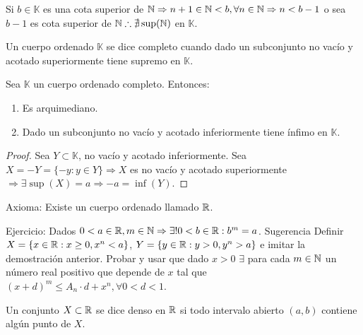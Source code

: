 Si \(b \in \mathbb{K} \) es una cota superior de \(\mathbb{N} \Rightarrow n+1 \in \mathbb{N}<b, \forall n \in \mathbb{N} \Rightarrow n < b-1\) o sea \(b-1\) es cota superior de \(\mathbb{N} \therefore \nexists \sup(\mathbb{N})\) en \(\mathbb{K} \).

\begin{definition}
    Un cuerpo ordenado \(\mathbb{K} \) se dice completo cuando dado un subconjunto no vacío y acotado superiormente tiene supremo en \(\mathbb{K} \).
\end{definition}

\begin{note}
    Sea \(\mathbb{K} \) un cuerpo ordenado completo. Entonces:
    \begin{enumerate}
        \item Es arquimediano.
        \item Dado un subconjunto no vacío y acotado inferiormente tiene ínfimo en \(\mathbb{K} \).
    \end{enumerate}
    \begin{proof}
        Sea \(Y \subset \mathbb{K} \), no vacío y acotado inferiormente. Sea \(X = -Y = \{ -y:y \in Y \} \Rightarrow X\) es no vacío y acotado superiormente \(\Rightarrow \exists \sup(X)=a \Rightarrow -a = \inf(Y)\).
    \end{proof}
\end{note}

Axioma: Existe un cuerpo ordenado llamado \(\mathbb{R} \).


Ejercicio: Dados \(0<a \in \mathbb{R}, m \in \mathbb{N} \Rightarrow \exists! 0<b\in \mathbb{R} : b^m =a\). Sugerencia Definir \(X = \{ x \in \mathbb{R} : x\geq0, x^n<a \} \), \(Y = \{ y \in \mathbb{R} : y>0, y^n >a \} \) e imitar la demostración anterior. Probar y usar que dado \(x>0\) \(\exists \) para cada \(m \in \mathbb{N} \) un número real positivo que depende de \(x\) tal que \({(x+d)}^m \leq A_n \cdot d + x^n, \forall 0<d<1\).

\begin{definition}
    Un conjunto \(X \subset \mathbb{R} \) se dice denso en \(\mathbb{R} \) si todo intervalo abierto \((a, b)\) contiene algún punto de \(X\).
\end{definition}

